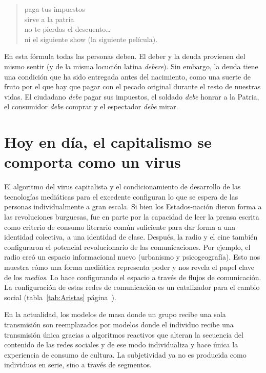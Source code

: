 \begin{quote}
	paga tus impuestos\\
	sirve a la patria\\
	no te pierdas el descuento\ldots{}\\
	ni el siguiente show (la siguiente película).
\end{quote}

En esta fórmula todas las personas deben. El deber y la deuda provienen del mismo sentir (y de la misma locución latina \emph{debere}). Sin embargo, la deuda tiene una condición que ha sido entregada antes del nacimiento, como una suerte de fruto por el que hay que pagar con el pecado original durante el resto de nuestras vidas. El ciudadano \emph{debe} pagar sus impuestos, el soldado \emph{debe} honrar a la Patria, el consumidor \emph{debe} comprar y el espectador \emph{debe} mirar.

\section{Hoy en día, el capitalismo se comporta como un virus}
\label{sec:viruscapitalista}

El algoritmo del virus capitalista y el condicionamiento de desarrollo de las tecnologías mediáticas para el excedente configuran lo que se espera de las personas individualmente a gran escala. Si bien los Estados-nación dieron forma a las revoluciones burguesas, fue en parte por la capacidad de leer la prensa escrita como criterio de consumo literario común suficiente para dar forma a una identidad colectiva, a una identidad de clase. Después, la radio y el cine también configuraron el potencial revolucionario de las comunicaciones. Por ejemplo, el radio creó un espacio informacional nuevo (urbanismo y psicogeografía). Esto nos muestra cómo una forma mediática representa poder y nos revela el papel clave de los \emph{medios}. Lo hace configurando el espacio a través de flujos de comunicación. La configuración de estas redes de comunicación es un catalizador para el cambio social (tabla~\ref{tab:Aristas} página~\pageref{tab:Aristas}).

En la actualidad, los modelos de masa donde un grupo recibe una sola transmisión son reemplazados por modelos donde el individuo recibe una transmisión única gracias a algoritmos reactivos que alteran la secuencia del contenido de las redes sociales y de ese modo individualiza y hace única la experiencia de consumo de cultura. La subjetividad ya no es producida como individuos en serie, sino a través de segmentos.

